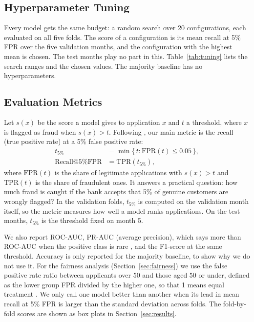 \subsection{Hyperparameter Tuning}
\label{sec:method-tuning}

Every model gets the same budget: a random search \cite{bergstra2012random} over 20 configurations,
each evaluated on all five folds. The score of a configuration is its mean recall at 5\% FPR over the
five validation months, and the configuration with the highest mean is chosen. The test months play
no part in this. Table~\ref{tab:tuning} lists the search ranges and the chosen values. The majority
baseline has no hyperparameters.



\subsection{Evaluation Metrics}
\label{sec:method-metrics}

Let $s(x)$ be the score a model gives to application $x$ and $t$ a threshold, where $x$ is flagged as
fraud when $s(x) > t$. Following \cite{jesus2022turning}, our main metric is the recall (true
positive rate) at a 5\% false positive rate:
\begin{align}
  t_{5\%} &= \min\{\,t : \mathrm{FPR}(t) \le 0.05\,\}, \\
  \mathrm{Recall@5\%FPR} &= \mathrm{TPR}(t_{5\%}),
\end{align}
where $\mathrm{FPR}(t)$ is the share of legitimate applications with $s(x)>t$ and
$\mathrm{TPR}(t)$ is the share of fraudulent ones. It answers a practical question: how much fraud is
caught if the bank accepts that 5\% of genuine customers are wrongly flagged? In the validation
folds, $t_{5\%}$ is computed on the validation month itself, so the metric measures how well a model
ranks applications. On the test months, $t_{5\%}$ is the threshold fixed on month 5.

We also report ROC-AUC, PR-AUC (average precision), which says more than ROC-AUC when the positive
class is rare \cite{saito2015precision}, and the F1-score at the same threshold. Accuracy is only
reported for the majority baseline, to show why we do not use it. For the fairness analysis
(Section~\ref{sec:fairness}) we use the false positive rate ratio between applicants over 50 and
those aged 50 or under, defined as the lower group FPR divided by the higher one, so that 1 means
equal treatment \cite{jesus2022turning}. We only call one model better than another when its lead in
mean recall at 5\% FPR is larger than the standard deviation across folds. The fold-by-fold scores
are shown as box plots in Section~\ref{sec:results}.

